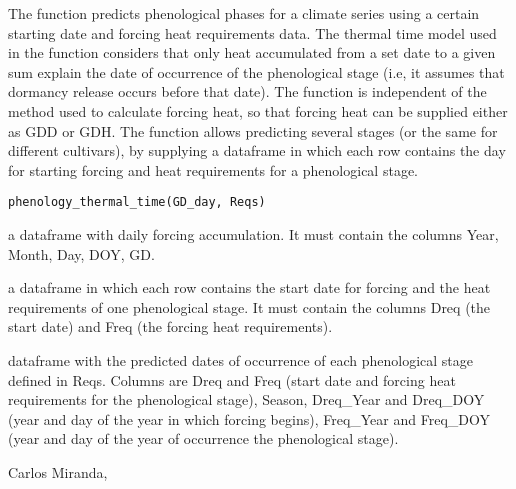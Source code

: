 \documentclass[a4paper]{book}
\begin{document}
%
\begin{Description}\relax
The function predicts phenological phases for a climate series
using a certain starting date and forcing heat requirements data.
The thermal time model used in the function considers that
only heat accumulated from a set date to a given sum explain the
date of occurrence of the phenological stage (i.e, it assumes that
dormancy release occurs before that date). The function is independent
of the method used to calculate forcing heat, so that forcing heat can
be supplied either as GDD or GDH. The function allows predicting several
stages (or the same for different cultivars), by supplying
a dataframe in which each row contains the day for starting forcing
and heat requirements for a phenological stage.
\end{Description}
%
\begin{Usage}
\begin{verbatim}
phenology_thermal_time(GD_day, Reqs)
\end{verbatim}
\end{Usage}
%
\begin{Arguments}
\begin{ldescription}
\item[\code{GD\_day}] a dataframe with daily forcing accumulation. It
must contain the columns Year, Month, Day, DOY, GD.

\item[\code{Reqs}] a dataframe in which each row contains the start date
for forcing and the heat requirements of one phenological stage. 
It must contain the columns Dreq (the start date) and Freq (the forcing 
heat requirements).
\end{ldescription}
\end{Arguments}
%
\begin{Value}
dataframe with the predicted dates of occurrence of each phenological 
stage defined in Reqs. Columns are Dreq and Freq (start date and forcing heat 
requirements for the phenological stage), Season, Dreq\_Year and Dreq\_DOY 
(year and day of the year in which forcing begins), Freq\_Year and Freq\_DOY 
(year and day of the year of occurrence the phenological stage).
\end{Value}
%
\begin{Author}\relax
Carlos Miranda, 
\end{Author}
%
\end{document}
